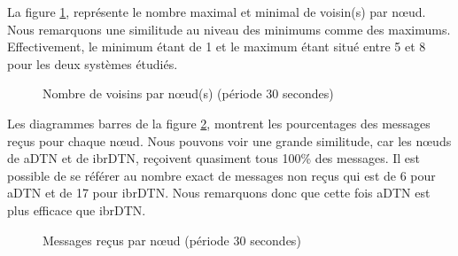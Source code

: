 \documentclass[a4paper,10pt]{article}
\begin{document}
La figure \ref{fig:30_nb_neighbors}, représente le nombre maximal et minimal de voisin(s) par nœud. Nous remarquons une similitude au niveau des minimums comme des maximums. Effectivement, le minimum étant de 1 et le maximum étant situé entre 5 et 8 pour les deux systèmes étudiés.\par

\begin{figure}[h!]
    \centering
    \caption{Nombre de voisins par nœud(s) (période 30 secondes)}
    \label{fig:30_nb_neighbors}
\end{figure}

Les diagrammes barres de la figure \ref{fig:30_msg_rcv}, montrent les pourcentages des messages reçus pour chaque nœud. Nous pouvons voir une grande similitude, car les nœuds de aDTN et de ibrDTN, reçoivent quasiment tous 100\% des messages. Il est possible de se référer au nombre exact de messages non reçus qui est de 6 pour aDTN et de 17 pour ibrDTN. Nous remarquons donc que cette fois aDTN est plus efficace que ibrDTN.\par

\begin{figure}[h!]
    \centering
    \caption{Messages reçus par nœud (période 30 secondes)}
    \label{fig:30_msg_rcv}
\end{figure}
\end{document}
